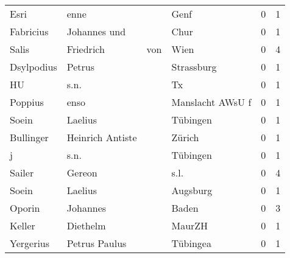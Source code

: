 \begin{tabular}{llllrr}
                     Esri &                               enne &             &                                        Genf &          0 &         1 \\
                Fabricius &                       Johannes und &             &                                        Chur &          0 &         1 \\
                    Salis &                          Friedrich &         von &                                        Wien &          0 &         4 \\
               Dsylpodius &                             Petrus &             &                                  Strassburg &          0 &         1 \\
                       HU &                               s.n. &             &                                          Tx &          0 &         1 \\
                  Poppius &                               enso &             &                            Manslacht AWsU f &          0 &         1 \\
                    Soein &                            Laelius &             &                                    Tübingen &          0 &         1 \\
                Bullinger &                   Heinrich Antiste &             &                                      Zürich &          0 &         1 \\
                        j &                               s.n. &             &                                    Tübingen &          0 &         1 \\
                   Sailer &                             Gereon &             &                                        s.l. &          0 &         4 \\
                    Soein &                            Laelius &             &                                    Augsburg &          0 &         1 \\
                   Oporin &                           Johannes &             &                                       Baden &          0 &         3 \\
                   Keller &                           Diethelm &             &                                      MaurZH &          0 &         1 \\
                Yergerius &                      Petrus Paulus &             &                                    Tübingea &          0 &         1 \\

\end{tabular}
